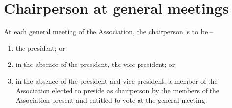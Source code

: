 \section{Chairperson at general meetings}
\label{rule:chair}

At each general meeting of the Association, the chairperson is to be --
\begin{enumerate}
	\item the president; or
	\item in the absence of the president, the vice-president; or
	\item in the absence of the president and vice-president, a member of the Association elected to preside as chairperson by the members of the Association present and entitled to vote at the general meeting.
\end{enumerate}
